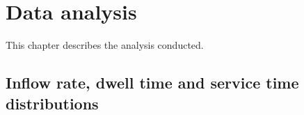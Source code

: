 \chapter{Data analysis}
\label{cha:data_analysis}

This chapter describes the analysis conducted.

\section{Inflow rate, dwell time and service time distributions}
\label{sec:rates_distributions}